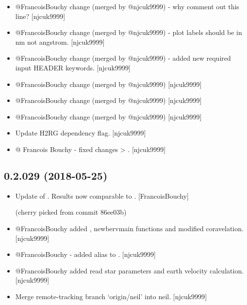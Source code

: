 \documentclass[a4paper,10pt,english]{report}
\begin{document}
\begin{itemize}
\begin{description}
\end{description}

\item {} 
@FrancoisBouchy change (merged by @njcuk9999) - why comment out this
line? {[}njcuk9999{]}

\item {} 
@FrancoisBouchy change (merged by @njcuk9999) - plot labels should be
in nm not angstrom. {[}njcuk9999{]}

\item {} 
@FrancoisBouchy change (merged by @njcuk9999) - added new required
input HEADER keywords. {[}njcuk9999{]}

\item {} 
@FrancoisBouchy change (merged by @njcuk9999) {[}njcuk9999{]}

\item {} 
@FrancoisBouchy change (merged by @njcuk9999) {[}njcuk9999{]}

\item {} 
@FrancoisBouchy change (merged by @njcuk9999) {[}njcuk9999{]}

\item {} 
Update H2RG dependency flag. {[}njcuk9999{]}

\item {} 
@ Francois Bouchy - fixed changes  \textendash{}\textgreater{} .
{[}njcuk9999{]}

\end{itemize}


\subsection{0.2.029 (2018-05-25)}
\label{\detokenize{misc/changelog:id430}}\begin{itemize}
\item {} 
Update of . Results now comparable to
. {[}FrancoisBouchy{]}

(cherry picked from commit 86ee03b)

\item {} 
@FrancoisBouchy added , newbervmain functions
and modified coravelation. {[}njcuk9999{]}

\item {} 
@FrancoisBouchy - added alias to .
{[}njcuk9999{]}

\item {} 
@FrancoisBouchy added read star parameters and earth velocity
calculation. {[}njcuk9999{]}

\item {} 
Merge remote-tracking branch ‘origin/neil’ into neil. {[}njcuk9999{]}

\end{itemize}
\end{document}
